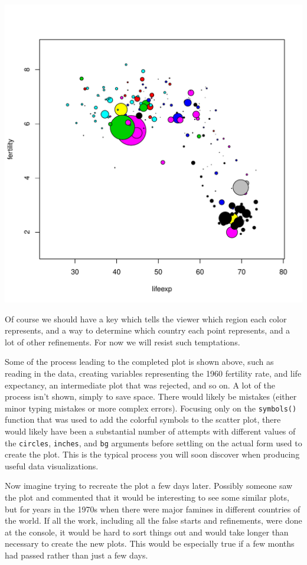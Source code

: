 \documentclass[12pt,oneside]{book}\usepackage[]{graphicx}\usepackage[]{color}
\makeatletter
\def\maxwidth{ %
  \ifdim\Gin@nat@width>\linewidth
    \linewidth
  \else
    \Gin@nat@width
  \fi
}
\newenvironment{knitrout}{}{} %
\makeatother
\begin{document}
\begin{knitrout}
\includegraphics[width=\maxwidth]{figure/unnamed-chunk-24-2} 

\end{knitrout}
Of course we should have a key which tells the viewer which region each color represents, and a way to determine which country each point represents, and a lot of other refinements. For now we will resist such temptations. 

Some of the process leading to the completed plot is shown above, such as reading in the data, creating variables representing the 1960 fertility rate, and life expectancy, an intermediate plot that was rejected, and so on. A lot of the process isn't shown, simply to save space. There would likely be mistakes (either minor typing mistakes or more complex errors). Focusing only on the \verb+symbols()+ function that was used to add the colorful symbols to the scatter plot, there would likely have been a substantial number of attempts with different values of the \verb+circles+, \verb+inches+, and \verb+bg+ arguments before settling on the actual form used to create the plot. This is the typical process you will soon discover when producing useful data visualizations. 

Now imagine trying to recreate the plot a few days later. Possibly someone saw the plot and commented that it would be interesting to see some similar plots, but for years in the 1970s when there were major famines in different countries of the world. If all the work, including all the false starts and refinements, were done at the console, it would be hard to sort things out and would take longer than necessary to create the new plots. This would be especially true if a few months had passed rather than just a few days.
\end{document}
